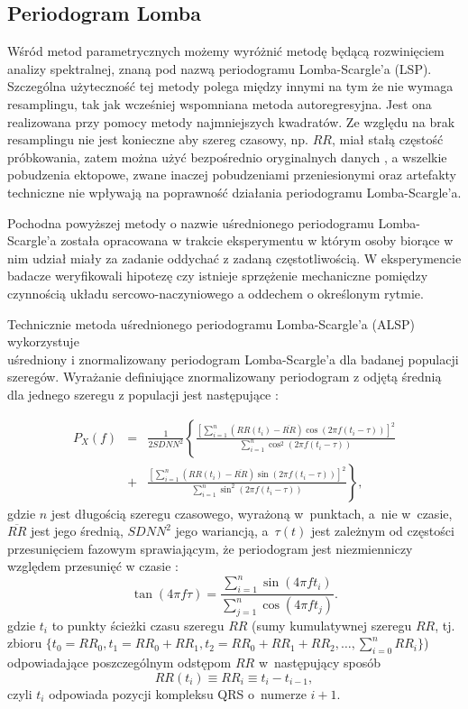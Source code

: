 \subsection{Periodogram Lomba}

Wśród metod parametrycznych możemy wyróżnić metodę będącą rozwinięciem analizy spektralnej,
znaną pod nazwą periodogramu Lomba-Scargle'a (LSP). Szczególna użyteczność tej metody
polega między innymi na tym że nie wymaga resamplingu, tak jak wcześniej wspomniana 
metoda autoregresyjna. Jest ona realizowana przy pomocy metody najmniejszych kwadratów.
Ze względu na brak resamplingu nie jest konieczne aby szereg czasowy, np. $RR$, miał stałą
częstość próbkowania, zatem można użyć bezpośrednio oryginalnych danych \cite{scargle, lomb_o, c++, thong},
a wszelkie pobudzenia ektopowe, zwane inaczej pobudzeniami przeniesionymi oraz
artefakty techniczne nie wpływają na poprawność działania periodogramu Lomba-Scargle'a.

Pochodna powyższej metody o nazwie uśrednionego periodogramu Lomba-Scargle'a została
opracowana w trakcie eksperymentu w którym osoby biorące w nim udział miały za zadanie
oddychać z zadaną częstotliwością. W eksperymencie badacze weryfikowali
hipotezę czy istnieje sprzężenie mechaniczne pomiędzy czynnością układu sercowo-naczyniowego
a oddechem o określonym rytmie. 

Technicznie metoda uśrednionego periodogramu Lomba-Scargle'a (ALSP) 
wykorzystuje\\uśredniony i znormalizowany periodogram Lomba-Scargle'a dla badanej populacji szeregów. Wyrażanie
definiujące znormalizowany periodogram z odjętą średnią dla jednego szeregu z populacji
jest następujące \cite{c++, thong, vanicek}:

\begin{eqnarray}
P_{X}(f)&=&\frac{1}{2SDNN^{2}}\left\{\frac{\left[ \sum_{i=1}^{n}(RR(t_{i})-\overline{RR})\cos(2\pi f(t_{i}-\tau))\right]^{2}}{\sum_{i=1}^{n}\cos^{2}(2\pi f(t_{i}-\tau))}\right. \label{LSPeriodogram}\nonumber\\ 
&+&\left. \frac{\left[ \sum_{i=1}^{n}(RR(t_{i})-\overline{RR})\sin(2\pi f(t_{i}-\tau))\right]^{2}}{\sum_{i=1}^{n}\sin^{2}(2\pi f(t_{i}-\tau))}\right\}
\label{eq:lomb} ,
\end{eqnarray}
gdzie $n$ jest długością szeregu czasowego, wyrażoną w~punktach, a~nie w~czasie,
$\overline{RR}$ jest jego średnią, $SDNN^{2}$ jego wariancją, a~$\tau(t)$ jest zależnym od
częstości przesunięciem fazowym sprawiającym, że periodogram jest niezmienniczy względem
przesunięć w czasie \cite{c++,thong,lomb,vanicek}:
\begin{equation}
\tan(4\pi f\tau)=\frac{\sum_{i=1}^{n}\sin(4\pi f t_{i})}{\sum_{j=1}^{n}\cos(4\pi f t_{j})}. \label{tau}
\end{equation}
gdzie $t_{i}$ to punkty ścieżki czasu szeregu $RR$ (sumy kumulatywnej szeregu $RR$, tj.
zbioru $\{t_0=RR_0, t_1=RR_0+RR_1, t_2=RR_0+RR_1+RR_2, \ldots, \sum_{i=0}^n RR_i \}$)
odpowiadające poszczególnym odstępom $RR$ w~następujący sposób
\begin{equation}
RR(t_{i})\equiv RR_{i}\equiv t_{i}-t_{i-1}, \label{RRy}
\end{equation}
czyli $t_{i}$ odpowiada pozycji kompleksu QRS o~numerze $i+1$.

